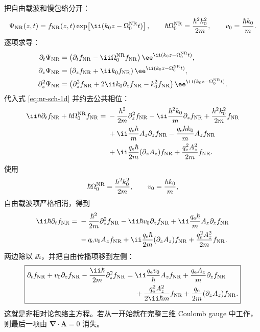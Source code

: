 把自由载波和慢包络分开：
\begin{equation}
\Psi_{\rm NR}(z,t)
=f_{\rm NR}(z,t)
\exp\!\left[\ii(k_0z-\Omega_0^{\rm NR}t)\right],
\qquad
\hbar\Omega_0^{\rm NR}=\frac{\hbar^2k_0^2}{2m},
\qquad
v_0=\frac{\hbar k_0}{m}.
\label{eq:nr-envelope-ansatz}
\end{equation}
逐项求导：
\begin{align}
\partial_t\Psi_{\rm NR}
&=
\left(\partial_tf_{\rm NR}-\ii\Omega_0^{\rm NR}f_{\rm NR}\right)
\ee^{\ii(k_0z-\Omega_0^{\rm NR}t)},\\
\partial_z\Psi_{\rm NR}
&=
\left(\partial_zf_{\rm NR}+\ii k_0f_{\rm NR}\right)
\ee^{\ii(k_0z-\Omega_0^{\rm NR}t)},\\
\partial_z^2\Psi_{\rm NR}
&=
\left(
\partial_z^2f_{\rm NR}
+2\ii k_0\partial_zf_{\rm NR}
-k_0^2f_{\rm NR}
\right)
\ee^{\ii(k_0z-\Omega_0^{\rm NR}t)}.
\label{eq:nr-derivatives}
\end{align}
代入式 \eqref{eq:nr-sch-1d} 并约去公共相位：
\begin{align}
\ii\hbar\partial_tf_{\rm NR}
+\hbar\Omega_0^{\rm NR}f_{\rm NR}
={}&
-\frac{\hbar^2}{2m}\partial_z^2f_{\rm NR}
-\ii\frac{\hbar^2k_0}{m}\partial_zf_{\rm NR}
+\frac{\hbar^2k_0^2}{2m}f_{\rm NR}\notag\\
&+\ii\frac{q_{\rm e}\hbar}{m}A_z\partial_zf_{\rm NR}
-\frac{q_{\rm e}\hbar k_0}{m}A_zf_{\rm NR}\notag\\
&+\ii\frac{q_{\rm e}\hbar}{2m}(\partial_zA_z)f_{\rm NR}
+\frac{q_{\rm e}^2A_z^2}{2m}f_{\rm NR}.
\end{align}
使用
\[
\hbar\Omega_0^{\rm NR}=\frac{\hbar^2k_0^2}{2m},
\qquad
v_0=\frac{\hbar k_0}{m},
\]
自由载波项严格相消，得到
\begin{align}
\ii\hbar\partial_tf_{\rm NR}
={}&
-\frac{\hbar^2}{2m}\partial_z^2f_{\rm NR}
-\ii\hbar v_0\partial_zf_{\rm NR}
+\ii\frac{q_{\rm e}\hbar}{m}A_z\partial_zf_{\rm NR}\notag\\
&-q_{\rm e}v_0A_zf_{\rm NR}
+\ii\frac{q_{\rm e}\hbar}{2m}(\partial_zA_z)f_{\rm NR}
+\frac{q_{\rm e}^2A_z^2}{2m}f_{\rm NR}.
\end{align}
两边除以 $\ii\hbar$，并把自由传播项移到左侧：
\begin{equation}
\boxed{
\begin{aligned}
\partial_tf_{\rm NR}
+v_0\partial_zf_{\rm NR}
-\frac{\ii\hbar}{2m}\partial_z^2f_{\rm NR}
={}&
\ii\frac{q_{\rm e}v_0}{\hbar}A_zf_{\rm NR}
+\frac{q_{\rm e}A_z}{m}\partial_zf_{\rm NR}\\
&+\frac{q_{\rm e}^2A_z^2}{2\ii\hbar m}f_{\rm NR}
+\frac{q_{\rm e}}{2m}(\partial_zA_z)f_{\rm NR}.
\end{aligned}}
\label{eq:nr-master}
\end{equation}
这就是非相对论包络主方程。若从一开始就在完整三维 Coulomb gauge 中工作，则最后一项由 $\bm\nabla\cdot\bm A=0$ 消失。

